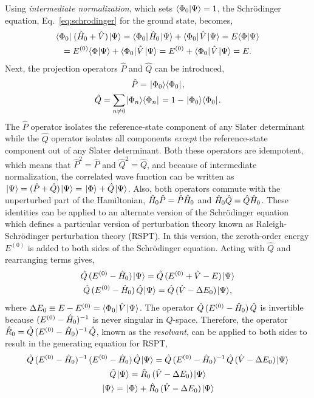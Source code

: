 \documentclass[thesis.tex]{subfiles}
\begin{document}
Using \textit{intermediate normalization}, which sets $\langle \Phi_{0} | \Psi\rangle = 1$, the Schr\"{o}dinger equation, Eq.\ \eqref{eq:schrodinger} for the ground state, becomes,
\begin{gather}
  \langle \Phi_{0} |\hspace{1pt}\mathop{(\hat{H}\hspace{-1pt}_{0} + \hat{V})}\hspace{1pt}\lvert \Psi \rangle = \langle \Phi_{0} |\hspace{1pt}\hat{H}\hspace{-1pt}_{0}\hspace{1pt}\lvert \Psi \rangle + \langle \Phi_{0} |\hspace{1pt}\hat{V}\hspace{1pt}\lvert \Psi \rangle = E\langle \Phi | \Psi\rangle \notag \\
  = E^{(0)}\langle \Phi | \Psi\rangle + \langle \Phi_{0} |\hspace{1pt}\hat{V}\hspace{1pt}\lvert \Psi \rangle = E^{(0)} + \langle \Phi_{0} |\hspace{1pt}\hat{V}\hspace{1pt}\lvert \Psi \rangle = E. \label{eq:mbpt_schrodinger}
\end{gather}
Next, the projection operators $\hat{P}$ and $\hat{Q}$ can be introduced,
\begin{gather}
  \hat{P} = \hspace{1pt}\lvert \Phi_{0} \rangle\langle \Phi_{0} |\hspace{1pt}, \\
  \hat{Q} = \sum_{n\neq 0}\hspace{1pt}\lvert \Phi_{n} \rangle\langle \Phi_{n} |\hspace{1pt} = 1 - \hspace{1pt}\lvert \Phi_{0} \rangle\langle \Phi_{0} |\hspace{1pt}.
\end{gather}
The $\hat{P}$ operator isolates the reference-state component of any Slater determinant while the $\hat{Q}$ operator isolates all components \textit{except} the reference-state component out of any Slater determinant.  Both these operators are idempotent, which means that $\hat{P}^{2} = \hat{P}$ and $\hat{Q}^{2} = \hat{Q}$, and because of intermediate normalization, the correlated wave function can be written as $\hspace{1pt}\lvert \Psi \rangle = \mathop{(\hat{P} + \hat{Q})}\hspace{1pt}\lvert \Psi \rangle = \hspace{1pt}\lvert \Phi \rangle + \hat{Q}\hspace{1pt}\lvert \Psi \rangle$.  Also, both operators commute with the unperturbed part of the Hamiltonian, $\hat{H}\hspace{-1pt}_{0}\hat{P} = \hat{P}\hat{H}\hspace{-1pt}_{0}$ and $\hat{H}\hspace{-1pt}_{0}\hat{Q} = \hat{Q}\hat{H}\hspace{-1pt}_{0}$.  These identities can be applied to an alternate version of the Schr\"{o}dinger equation which defines a particular version of perturbation theory known as Raleigh-Schr\"{o}dinger perturbation theory (RSPT). In this version, the zeroth-order energy $E^{(0)}$ is added to both sides of the Schr\"{o}dinger equation.  Acting with $\hat{Q}$ and rearranging terms gives,
\begin{gather}
  \hat{Q}\mathop{(E^{(0)} - \hat{H}\hspace{-1pt}_{0})}\hspace{1pt}\lvert \Psi \rangle = \hat{Q}\mathop{(E^{(0)} + \hat{V} - E)}\hspace{1pt}\lvert \Psi \rangle \notag \\
  \hat{Q}\mathop{(E^{(0)} - \hat{H}\hspace{-1pt}_{0})}\hat{Q}\hspace{1pt}\lvert \Psi \rangle = \hat{Q}\mathop{(\hat{V} - \Delta E_{0})}\hspace{1pt}\lvert \Psi \rangle,
\end{gather}
where $\Delta E_{0} \equiv E - E^{(0)} = \langle \Phi_{0} |\hspace{1pt}\hat{V}\hspace{1pt}\lvert \Psi \rangle$.  The operator $\hat{Q}\mathop{(E^{(0)} - \hat{H}\hspace{-1pt}_{0})}\hat{Q}$ is invertible because $\mathop{(E^{(0)} - \hat{H}\hspace{-1pt}_{0})^{-1}}$ is never singular in $Q$-space.  Therefore, the operator $\hat{R}_{0} = \hat{Q}\mathop{(E^{(0)} - \hat{H}\hspace{-1pt}_{0})^{-1}}\hat{Q}$, known as the \textit{resolvant}, can be applied to both sides to result in the generating equation for RSPT,
\begin{gather}
  \hat{Q}\mathop{(E^{(0)} - \hat{H}\hspace{-1pt}_{0})^{-1}}\mathop{(E^{(0)} - \hat{H}\hspace{-1pt}_{0})}\hat{Q}\hspace{1pt}\lvert \Psi \rangle = \hat{Q}\mathop{(E^{(0)} - \hat{H}\hspace{-1pt}_{0})^{-1}}\hat{Q}\mathop{(\hat{V} - \Delta E_{0})}\hspace{1pt}\lvert \Psi \rangle \notag \\
  \hat{Q}\hspace{1pt}\lvert \Psi \rangle = \hat{R}_{0}\mathop{(\hat{V} - \Delta E_{0})}\hspace{1pt}\lvert \Psi \rangle \notag \\
  \hspace{1pt}\lvert \Psi \rangle = \hspace{1pt}\lvert \Phi \rangle + \hat{R}_{0}\mathop{(\hat{V} - \Delta E_{0})}\hspace{1pt}\lvert \Psi \rangle
\end{gather}
\end{document}
